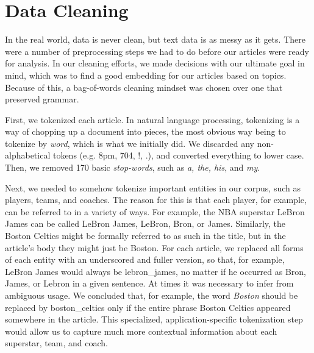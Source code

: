 \documentclass[11pt]{article}
\begin{document}
\section{Data Cleaning}
In the real world, data is never clean, but text data is as messy as it gets. There were a number of preprocessing steps we had to do before our articles were ready for analysis. In our cleaning efforts, we made decisions with our ultimate goal in mind, which was to find a good embedding for our articles based on topics.  Because of this, a bag-of-words cleaning mindset was chosen over one that preserved grammar.

First, we tokenized each article. In natural language processing, tokenizing is a way of chopping up a document into pieces, the most obvious way being to tokenize by \textit{word}, which is what we initially did.  We discarded any non-alphabetical tokens (e.g. 8pm, 704, !, .), and converted everything to lower case.  Then, we removed 170 basic \textit{stop-words}, such as \textit{a, the, his}, and \textit{my}. 


Next, we needed to somehow tokenize important entities in our corpus, such as players, teams, and coaches. The reason for this is that each player, for example, can be referred to in a variety of ways. For example, the NBA superstar LeBron James can be called LeBron James, LeBron, Bron, or James. Similarly, the Boston Celtics might be formally referred to as such in the title, but in the article's body they might just be Boston. For each article, we replaced all forms of each entity with an underscored and fuller version, so that, for example, LeBron James would always be lebron\_james, no matter if he occurred as Bron, James, or Lebron in a given sentence.  At times it was necessary to infer from ambiguous usage. We concluded that, for example, the word \textit{Boston} should be replaced by boston\_celtics only if the entire phrase Boston Celtics appeared somewhere in the article.  This specialized, application-specific tokenization step would allow us to capture much more contextual information about each superstar, team, and coach.
\end{document}

